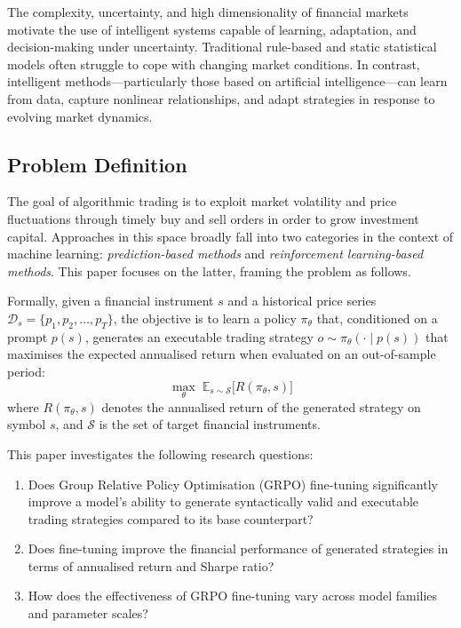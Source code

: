 \documentclass[conference]{IEEEtran}
\begin{document}
The complexity, uncertainty, and high dimensionality of financial markets motivate the use of
intelligent systems capable of learning, adaptation, and decision-making under uncertainty.
Traditional rule-based and static statistical models often struggle to cope with changing market
conditions. In contrast, intelligent methods---particularly those based on artificial
intelligence---can learn from data, capture nonlinear relationships, and adapt strategies in
response to evolving market dynamics.

\subsection{Problem Definition}
\label{sec:problem}

The goal of algorithmic trading is to exploit market volatility and price fluctuations through
timely buy and sell orders in order to grow investment capital. Approaches in this space broadly
fall into two categories in the context of machine learning: \emph{prediction-based methods} and
\emph{reinforcement learning-based methods}. This paper focuses on the latter, framing the problem
as follows.

Formally, given a financial instrument $s$ and a historical price series
$\mathcal{D}_s = \{p_1, p_2, \ldots, p_T\}$, the objective is to learn a policy $\pi_\theta$ that,
conditioned on a prompt $p(s)$, generates an executable trading strategy
$o \sim \pi_\theta(\cdot \mid p(s))$ that maximises the expected annualised return when evaluated
on an out-of-sample period:
\begin{equation}
  \max_\theta \; \mathbb{E}_{s \sim \mathcal{S}}\bigl[R(\pi_\theta, s)\bigr]
\end{equation}
where $R(\pi_\theta, s)$ denotes the annualised return of the generated strategy on symbol $s$, and
$\mathcal{S}$ is the set of target financial instruments.

This paper investigates the following research questions:
\begin{enumerate}
  \item[\textbf{RQ1}] Does Group Relative Policy Optimisation (GRPO) fine-tuning significantly improve a model's ability to generate
    syntactically valid and executable trading strategies compared to its base counterpart?
  \item[\textbf{RQ2}] Does fine-tuning improve the financial performance of generated strategies
    in terms of annualised return and Sharpe ratio?
  \item[\textbf{RQ3}] How does the effectiveness of GRPO fine-tuning vary across model families
    and parameter scales?
\end{enumerate}
\end{document}
